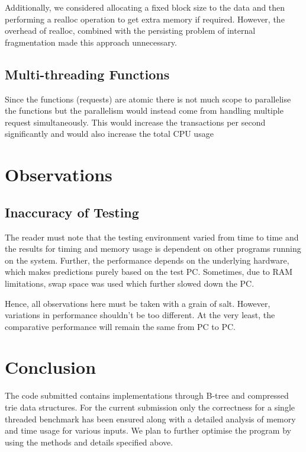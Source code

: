 \documentclass{article}
\begin{document}
Additionally, we considered allocating a fixed block size to the data and then performing a realloc operation to get extra memory if required. However, the overhead of realloc, combined with the persisting problem of internal fragmentation made this approach unnecessary. 

\subsection{Multi-threading Functions}
Since the functions (requests) are atomic there is not much scope to parallelise the functions but the parallelism would instead come from handling multiple request simultaneously. This would increase the transactions per second significantly and would also increase the total CPU usage 

\section{Observations}

\subsection{Inaccuracy of Testing}

The reader must note that the testing environment varied from time to time and the results for timing and memory usage is dependent on other programs running on the system. Further, the performance depends on the underlying hardware, which makes predictions purely based on the test PC. Sometimes, due to RAM limitations, swap space was used which further slowed down the PC.

Hence, all observations here must be taken with a grain of salt. However, variations in performance shouldn't be too different. At the very least, the comparative performance will remain the same from PC to PC.

\section{Conclusion}
The code submitted contains implementations through B-tree and compressed trie data structures. For the current submission only the correctness for a single threaded benchmark has been ensured along with a detailed analysis of memory and time usage for various inputs. We plan to further optimise the program by using the methods and details specified above.  
\end{document}
